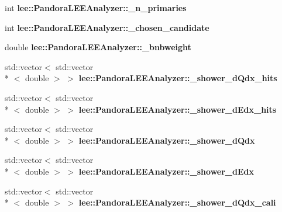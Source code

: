 \begin{DoxyCompactItemize}
\item 
\hypertarget{group__lee_ga9cb9605f2fe0af2464f936651659ad91}{int {\bfseries lee\-::\-Pandora\-L\-E\-E\-Analyzer\-::\-\_\-n\-\_\-primaries}}\label{group__lee_ga9cb9605f2fe0af2464f936651659ad91}

\item 
\hypertarget{group__lee_ga258cdf1c3fb847abc6f3aad95f8471d0}{int {\bfseries lee\-::\-Pandora\-L\-E\-E\-Analyzer\-::\-\_\-chosen\-\_\-candidate}}\label{group__lee_ga258cdf1c3fb847abc6f3aad95f8471d0}

\item 
\hypertarget{group__lee_ga9450f1c2fbd4efa3927094f9953c5041}{double {\bfseries lee\-::\-Pandora\-L\-E\-E\-Analyzer\-::\-\_\-bnbweight}}\label{group__lee_ga9450f1c2fbd4efa3927094f9953c5041}

\item 
\hypertarget{group__lee_gaa6b9f1a06dcc4c9b5e7ad66b2a5f3995}{std\-::vector$<$ std\-::vector\\*
$<$ double $>$ $>$ {\bfseries lee\-::\-Pandora\-L\-E\-E\-Analyzer\-::\-\_\-shower\-\_\-d\-Qdx\-\_\-hits}}\label{group__lee_gaa6b9f1a06dcc4c9b5e7ad66b2a5f3995}

\item 
\hypertarget{group__lee_ga8dc5bf5791d750d7481aa6a4051433d3}{std\-::vector$<$ std\-::vector\\*
$<$ double $>$ $>$ {\bfseries lee\-::\-Pandora\-L\-E\-E\-Analyzer\-::\-\_\-shower\-\_\-d\-Edx\-\_\-hits}}\label{group__lee_ga8dc5bf5791d750d7481aa6a4051433d3}

\item 
\hypertarget{group__lee_gaec600c2d05138143cbef4f23c44d92cf}{std\-::vector$<$ std\-::vector\\*
$<$ double $>$ $>$ {\bfseries lee\-::\-Pandora\-L\-E\-E\-Analyzer\-::\-\_\-shower\-\_\-d\-Qdx}}\label{group__lee_gaec600c2d05138143cbef4f23c44d92cf}

\item 
\hypertarget{group__lee_gab709b5ce1a5b80131bd14a57c2e82bf5}{std\-::vector$<$ std\-::vector\\*
$<$ double $>$ $>$ {\bfseries lee\-::\-Pandora\-L\-E\-E\-Analyzer\-::\-\_\-shower\-\_\-d\-Edx}}\label{group__lee_gab709b5ce1a5b80131bd14a57c2e82bf5}

\item 
\hypertarget{group__lee_gaaf81a95a1829c0041e9770be3d09f240}{std\-::vector$<$ std\-::vector\\*
$<$ double $>$ $>$ {\bfseries lee\-::\-Pandora\-L\-E\-E\-Analyzer\-::\-\_\-shower\-\_\-d\-Qdx\-\_\-cali}}\label{group__lee_gaaf81a95a1829c0041e9770be3d09f240}


\end{DoxyCompactItemize}
